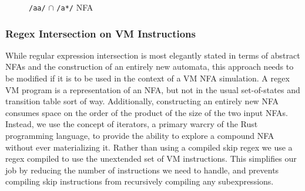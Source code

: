 \begin{figure}
\centering
\caption{{\tt /aa/} $\cap$ {\tt /a*/} NFA}
\label{fig:NFAaa:astar}
\end{figure}

\subsubsection{Regex Intersection on VM Instructions}

While regular expression intersection is most elegantly stated
in terms of abstract NFAs and the construction of an entirely
new automata, this approach needs to be modified if it is
to be used in the context of a VM NFA simulation. A regex
VM program is a representation of an NFA, but not in the usual
set-of-states and transition
table sort of way. Additionally, constructing an entirely
new NFA consumes space on the order of the product of the
size of the two input NFAs. Instead, we use the concept of
iterators, a primary warcry of the Rust programming language,
to provide the ability to explore a compound NFA without
ever materializing it. Rather than using a compiled
skip regex we use a regex compiled to use the unextended
set of VM instructions. This simplifies our job by reducing
the number of instructions we need to handle, and prevents
compiling skip instructions from recursively compiling any
subexpressions.

